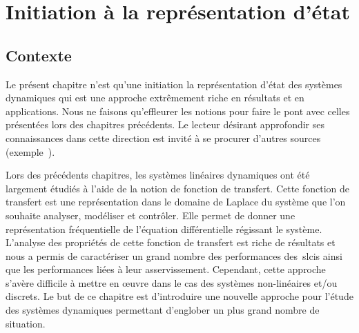 \chapter[Représentation d'état]
{Initiation à la représentation d'état\label{chap-repreEtat}}
\minitoc
\newpage
\section{Contexte}
Le présent chapitre n'est qu'une initiation la représentation d'état des 
systèmes dynamiques qui est une approche extrêmement riche en résultats et 
en applications. Nous ne faisons qu'effleurer les notions pour
faire le pont avec celles présentées lors des chapitres précédents. 
Le lecteur désirant approfondir ses connaissances dans cette direction est 
invité à se procurer d'autres sources (exemple~\cite{Bachelier}). 

Lors des précédents chapitres, les systèmes linéaires dynamiques ont été 
largement étudiés à l'aide de la notion de fonction de transfert. Cette 
fonction de transfert est une représentation dans le domaine de Laplace 
du système que l'on souhaite analyser, modéliser et contrôler. Elle permet 
de donner une représentation fréquentielle de l'équation différentielle 
régissant le système. L'analyse des propriétés de cette fonction de transfert 
est riche de résultats et nous a permis de caractériser un grand nombre des 
performances des~\glspl{slci} ainsi que les performances liées à leur 
asservissement. 
Cependant, cette approche s'avère difficile à mettre en œuvre dans le cas 
des systèmes non-linéaires et/ou discrets. Le but de ce chapitre est 
d'introduire une nouvelle approche  pour l'étude des systèmes dynamiques 
permettant d'englober un plus grand nombre de situation. 

